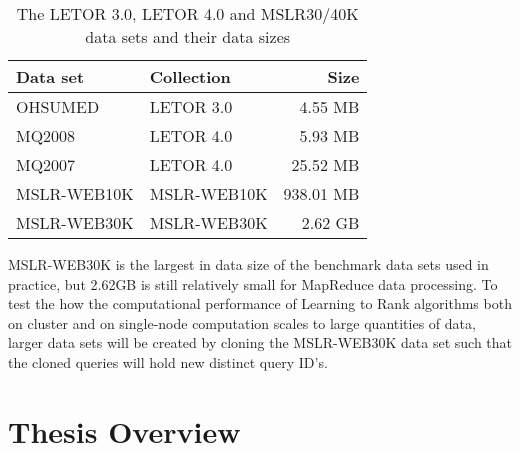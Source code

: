 \begin{table}[!h]
\centering
\begin{tabular}{p{3.4cm}p{3.4cm}r}\toprule
Data set & Collection & Size \\
\midrule
OHSUMED     & LETOR 3.0       &   4.55 MB\\
MQ2008      & LETOR 4.0       &   5.93 MB\\
MQ2007      & LETOR 4.0       &  25.52 MB\\
MSLR-WEB10K & MSLR-WEB10K     & 938.01 MB\\
MSLR-WEB30K & MSLR-WEB30K     &   2.62 GB\\
\bottomrule
\end{tabular}
\caption{The LETOR 3.0, LETOR 4.0 and MSLR30/40K data sets and their data sizes}
\label{tbl:initial_datasets}
\end{table}

MSLR-WEB30K is the largest in data size of the benchmark data sets used in practice, but 2.62GB is still relatively small for MapReduce data processing. To test the how the computational performance of Learning to Rank algorithms both on cluster and on single-node computation scales to large quantities of data, larger data sets will be created by cloning the MSLR-WEB30K data set such that the cloned queries will hold new distinct query ID's.
\section{Thesis Overview}

